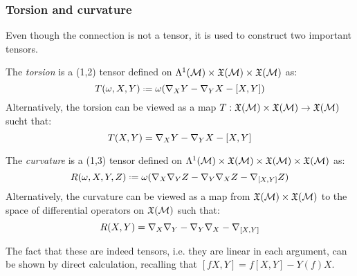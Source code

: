 \subsubsection{Torsion and curvature}

Even though the connection is not a tensor, it is used to construct two important tensors.

\begin{definition}
  The \textit{torsion} is a (1,2) tensor defined on $ \Lambda^{1}(\mathcal{M}) \times \mathfrak{X}(\mathcal{M}) \times \mathfrak{X}(\mathcal{M}) $ as:
  \begin{equation}
    T(\omega,X,Y) \defeq \omega (\na_X Y - \na_Y X - [X,Y])
    \label{eq:3.31}
  \end{equation}
  Alternatively, the torsion can be viewed as a map $ T : \mathfrak{X}(\mathcal{M}) \times \mathfrak{X}(\mathcal{M}) \rightarrow \mathfrak{X}(\mathcal{M}) $ sucht that:
  \begin{equation}
    T(X,Y) = \nabla_X Y - \nabla_Y X - [X,Y]
    \label{eq:3.32}
  \end{equation}
\end{definition}

\begin{definition}
  The \textit{curvature} is a (1,3) tensor defined on $ \Lambda^{1}(\mathcal{M}) \times \mathfrak{X}(\mathcal{M}) \times \mathfrak{X}(\mathcal{M}) \times \mathfrak{X}(\mathcal{M}) $ as:
  \begin{equation}
    R(\omega,X,Y,Z) \defeq \omega (\na_X \na_Y Z - \na_Y \na_X Z - \na_{[X,Y]} Z)
    \label{eq:3.33}
  \end{equation}
  Alternatively, the curvature can be viewed as a map from $ \mathfrak{X}(\mathcal{M}) \times \mathfrak{X}(\mathcal{M}) $ to the space of differential operators on $ \mathfrak{X}(\mathcal{M}) $ such that:
  \begin{equation}
    R(X,Y) = \nabla_X \nabla_Y - \nabla_Y \nabla_X - \nabla_{[X,Y]}
    \label{eq:3.34}
  \end{equation}
\end{definition}

The fact that these are indeed tensors, i.e. they are linear in each argument, can be shown by direct calculation, recalling that $ [fX,Y] = f[X,Y] - Y(f) X $.

